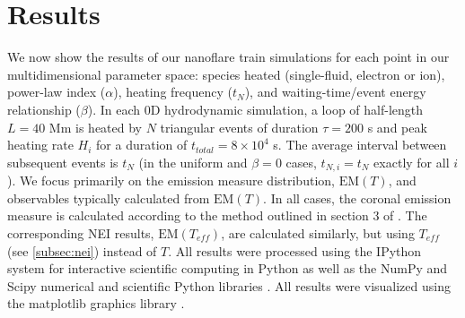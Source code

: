 \documentclass[preprint,linenumbers]{aastex}
\begin{document}
	\section{Results}
	\label{sec:results}
	\par We now show the results of our nanoflare train simulations for each point in our multidimensional parameter space: species heated (single-fluid, electron or ion), power-law index ($\alpha$), heating frequency ($t_N$), and waiting-time/event energy relationship ($\beta$). In each 0D hydrodynamic simulation, a loop of half-length $L=40$ Mm is heated by $N$ triangular events of duration $\tau=200$ s and peak heating rate $H_i$ for a duration of $t_{total}=8\times10^4$ s. The average interval between subsequent events is $t_N$ (in the uniform and $\beta=0$ cases, $t_{N,i}=t_N$ exactly for all $i$). We focus primarily on the emission measure distribution, $\mathrm{EM}(T)$, and observables typically calculated from $\mathrm{EM}(T)$. In all cases, the coronal emission measure is calculated according to the method outlined in section 3 of . The corresponding NEI results, $\mathrm{EM}(T_{eff})$, are calculated similarly, but using $T_{eff}$ (see \autoref{subsec:nei}) instead of $T$. All results were processed using the IPython system for interactive scientific computing in Python \citep{perez_ipython:_2007} as well as the NumPy and Scipy numerical and scientific Python libraries \citep{van_der_walt_numpy_2011}. All results were visualized using the matplotlib graphics library \citep{hunter_matplotlib:_2007}.
\end{document}
